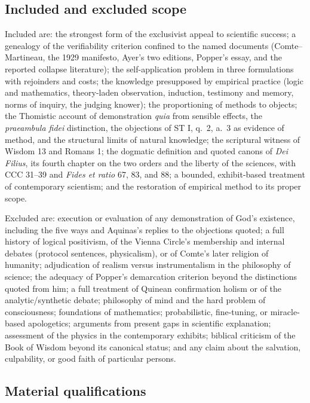 \subsection{Included and excluded scope}

Included are: the strongest form of the exclusivist appeal to scientific success; a genealogy of the verifiability criterion confined to the named documents (Comte--Martineau, the 1929 manifesto, Ayer's two editions, Popper's essay, and the reported collapse literature); the self-application problem in three formulations with rejoinders and costs; the knowledge presupposed by empirical practice (logic and mathematics, theory-laden observation, induction, testimony and memory, norms of inquiry, the judging knower); the proportioning of methods to objects; the Thomistic account of demonstration \emph{quia} from sensible effects, the \emph{praeambula fidei} distinction, the objections of ST I, q.~2, a.~3 as evidence of method, and the structural limits of natural knowledge; the scriptural witness of Wisdom 13 and Romans 1; the dogmatic definition and quoted canons of \emph{Dei Filius}, its fourth chapter on the two orders and the liberty of the sciences, with CCC 31--39 and \emph{Fides et ratio} 67, 83, and 88; a bounded, exhibit-based treatment of contemporary scientism; and the restoration of empirical method to its proper scope.

Excluded are: execution or evaluation of any demonstration of God's existence, including the five ways and Aquinas's replies to the objections quoted; a full history of logical positivism, of the Vienna Circle's membership and internal debates (protocol sentences, physicalism), or of Comte's later religion of humanity; adjudication of realism versus instrumentalism in the philosophy of science; the adequacy of Popper's demarcation criterion beyond the distinctions quoted from him; a full treatment of Quinean confirmation holism or of the analytic/synthetic debate; philosophy of mind and the hard problem of consciousness; foundations of mathematics; probabilistic, fine-tuning, or miracle-based apologetics; arguments from present gaps in scientific explanation; assessment of the physics in the contemporary exhibits; biblical criticism of the Book of Wisdom beyond its canonical status; and any claim about the salvation, culpability, or good faith of particular persons.

\subsection{Material qualifications}


